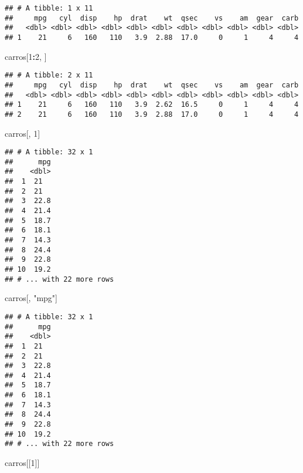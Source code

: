 \documentclass[]{book}
\newenvironment{Shaded}{\begin{snugshade}}{\end{snugshade}}
\newcommand{\DecValTok}[1]{\textcolor[rgb]{0.00,0.00,0.81}{#1}}
\newcommand{\NormalTok}[1]{#1}
\newcommand{\OperatorTok}[1]{\textcolor[rgb]{0.81,0.36,0.00}{\textbf{#1}}}
\newcommand{\StringTok}[1]{\textcolor[rgb]{0.31,0.60,0.02}{#1}}
\begin{document}
\begin{verbatim}
## # A tibble: 1 x 11
##     mpg   cyl  disp    hp  drat    wt  qsec    vs    am  gear  carb
##   <dbl> <dbl> <dbl> <dbl> <dbl> <dbl> <dbl> <dbl> <dbl> <dbl> <dbl>
## 1    21     6   160   110   3.9  2.88  17.0     0     1     4     4
\end{verbatim}

\begin{Shaded}
\begin{Highlighting}[]
\NormalTok{carros[}\DecValTok{1}\OperatorTok{:}\DecValTok{2}\NormalTok{, ]}
\end{Highlighting}
\end{Shaded}

\begin{verbatim}
## # A tibble: 2 x 11
##     mpg   cyl  disp    hp  drat    wt  qsec    vs    am  gear  carb
##   <dbl> <dbl> <dbl> <dbl> <dbl> <dbl> <dbl> <dbl> <dbl> <dbl> <dbl>
## 1    21     6   160   110   3.9  2.62  16.5     0     1     4     4
## 2    21     6   160   110   3.9  2.88  17.0     0     1     4     4
\end{verbatim}

\begin{Shaded}
\begin{Highlighting}[]
\NormalTok{carros[, }\DecValTok{1}\NormalTok{]}
\end{Highlighting}
\end{Shaded}

\begin{verbatim}
## # A tibble: 32 x 1
##      mpg
##    <dbl>
##  1  21  
##  2  21  
##  3  22.8
##  4  21.4
##  5  18.7
##  6  18.1
##  7  14.3
##  8  24.4
##  9  22.8
## 10  19.2
## # ... with 22 more rows
\end{verbatim}

\begin{Shaded}
\begin{Highlighting}[]
\NormalTok{carros[, }\StringTok{"mpg"}\NormalTok{]}
\end{Highlighting}
\end{Shaded}

\begin{verbatim}
## # A tibble: 32 x 1
##      mpg
##    <dbl>
##  1  21  
##  2  21  
##  3  22.8
##  4  21.4
##  5  18.7
##  6  18.1
##  7  14.3
##  8  24.4
##  9  22.8
## 10  19.2
## # ... with 22 more rows
\end{verbatim}

\begin{Shaded}
\begin{Highlighting}[]
\NormalTok{carros[[}\DecValTok{1}\NormalTok{]]}
\end{Highlighting}
\end{Shaded}
\end{document}
